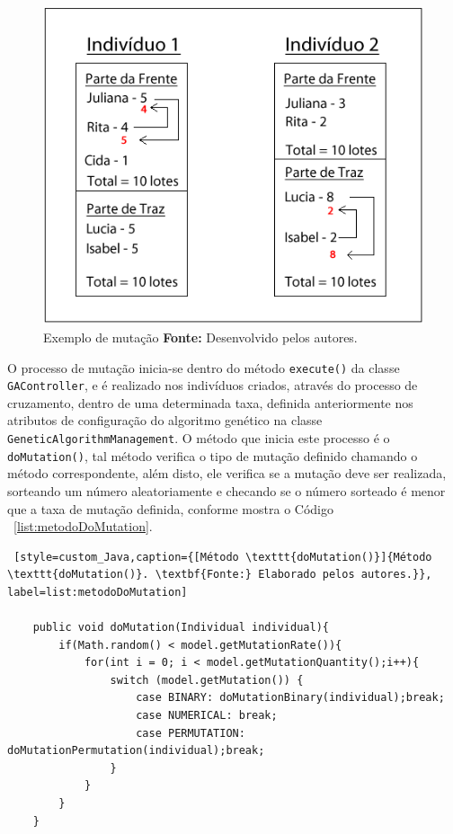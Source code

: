 \begin{figure}[h!]
	\centerline{\includegraphics[scale=0.7]{./imagens/mutacao_cromossomo.png}}
	\caption[Exemplo de mutação]
	{Exemplo de mutação
		\textbf{Fonte:} Desenvolvido pelos autores.}
	\label{fig:ex_mutacao}
\end{figure}


\par O processo de mutação inicia-se dentro do método \texttt{execute()} da classe \texttt{GAController}, e é realizado nos indivíduos
criados, através do processo de cruzamento, dentro de uma determinada taxa, definida anteriormente nos atributos de configuração do algoritmo genético na classe \texttt{GeneticAlgorithmManagement}. O método que inicia este processo é o \texttt{doMutation()}, tal método verifica o tipo de mutação definido chamando o método correspondente, além disto, ele verifica se a mutação deve ser realizada, sorteando um número aleatoriamente e checando se o número sorteado é menor que a taxa de mutação definida, conforme mostra o Código ~\ref{list:metodoDoMutation}. 

\begin{lstlisting} [style=custom_Java,caption={[Método \texttt{doMutation()}]{Método \texttt{doMutation()}. \textbf{Fonte:} Elaborado pelos autores.}}, label=list:metodoDoMutation] 

	public void doMutation(Individual individual){
		if(Math.random() < model.getMutationRate()){
			for(int i = 0; i < model.getMutationQuantity();i++){
				switch (model.getMutation()) {
					case BINARY: doMutationBinary(individual);break;
					case NUMERICAL: break;
					case PERMUTATION: doMutationPermutation(individual);break;
				}
			}
		}
	}

\end{lstlisting}

